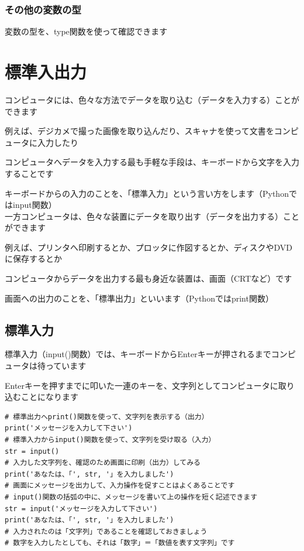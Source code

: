 \documentclass[uplatex,a4paper,11pt,oneside,openany]{jsbook}
\begin{document}
\subsubsection{その他の変数の型}

変数の型を、type関数を使って確認できます



\section{標準入出力}

コンピュータには、色々な方法でデータを取り込む（データを入力する）ことができます

例えば、デジカメで撮った画像を取り込んだり、スキャナを使って文書をコンピュータに入力したり

コンピュータへデータを入力する最も手軽な手段は、キーボードから文字を入力することです

キーボードからの入力のことを、「標準入力」という言い方をします（Pythonではinput関数）\\

一方コンピュータは、色々な装置にデータを取り出す（データを出力する）ことができます

例えば、プリンタへ印刷するとか、プロッタに作図するとか、ディスクやDVDに保存するとか

コンピュータからデータを出力する最も身近な装置は、画面（CRTなど）です

画面への出力のことを、「標準出力」といいます（Pythonではprint関数）

\subsection{標準入力}

標準入力（input()関数）では、キーボードからEnterキーが押されるまでコンピュータは待っています

Enterキーを押すまでに叩いた一連のキーを、文字列としてコンピュータに取り込むことになります

\begin{lstlisting}
# 標準出力へprint()関数を使って、文字列を表示する（出力）
print('メッセージを入力して下さい')
# 標準入力からinput()関数を使って、文字列を受け取る（入力）
str = input()
# 入力した文字列を、確認のため画面に印刷（出力）してみる
print('あなたは、「', str, '」を入力しました')
# 画面にメッセージを出力して、入力操作を促すことはよくあることです
# input()関数の括弧の中に、メッセージを書いて上の操作を短く記述できます
str = input('メッセージを入力して下さい')
print('あなたは、「', str, '」を入力しました')
# 入力されたのは「文字列」であることを確認しておきましょう
# 数字を入力したとしても、それは「数字」＝「数値を表す文字列」です
\end{lstlisting}
\end{document}
